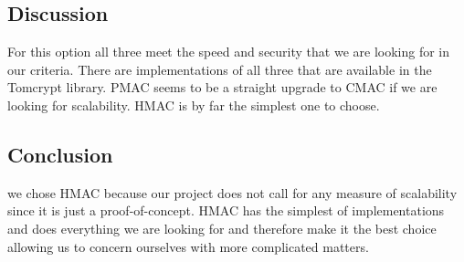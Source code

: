 \subsection{Discussion}     
For this option all three meet the speed and security that we are looking for in our criteria. There are implementations of all three that are available in the Tomcrypt library. PMAC seems to be a straight upgrade to CMAC if we are looking for scalability. HMAC is by far the simplest one to choose. 
\subsection{Conclusion}
we chose HMAC because our project does not call for any measure of scalability since it is just a proof-of-concept. HMAC has the simplest of implementations and does everything we are looking for and therefore make it the best choice allowing us to concern ourselves with more complicated matters.

    
\patchcmd{\thebibliography}
{}{}{}{}
    
